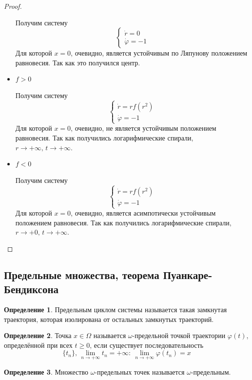 \documentclass[a4paper,12pt]{article}
\renewcommand{\phi}{\ensuremath{\varphi}}
\renewcommand{\geq}{\ensuremath{\geqslant}}
\theoremstyle{plain}
\theoremstyle{definition}
\newtheorem{definition}{Определение}[section]
\theoremstyle{remark}
\begin{document}
\begin{proof}
\begin{itemize}
		      Получим систему
		      \[\begin{cases}
				      \dot{r} = 0 \\
				      \dot{\phi} = -1
			      \end{cases}\]
		      Для которой $x = 0$, очевидно, является устойчивым по Ляпунову положением равновесия. Так как это получился центр.
		\item $f > 0$

		      Получим систему
		      \[\begin{cases}
				      \dot{r} = rf(r^2) \\
				      \dot{\phi} = -1
			      \end{cases}\]
		      Для которой $x = 0$, очевидно, не является устойчивым положением равновесия. Так как получились логарифмические спирали, $r \to +\infty,\, t \to +\infty$.
		\item $f < 0$

		      Получим систему
		      \[\begin{cases}
				      \dot{r} = rf(r^2) \\
				      \dot{\phi} = -1
			      \end{cases}\]
		      Для которой $x = 0$, очевидно, является асимпотически устойчивым положением равновесия. Так как получились логарифмические спирали, $r \to +0,\, t \to +\infty$.
	\end{itemize}
\end{proof}

\subsection{Предельные множества, теорема Пуанкаре-Бендиксона}
\begin{definition}
	Предельным циклом системы называется такая замкнутая траектория, которая изолирована от остальных замкнутых траекторий.
\end{definition}

\begin{definition}
	Точка $x \in \Omega$ называется $\omega$-предельной точкой траектории $\phi(t)$, определённой при всех $t \geq 0$, если существует последовательность
	\[\{t_n\},\, \lim_{n \to +\infty} t_n = +\infty:\: \lim_{n \to +\infty} \phi(t_n) = x\]
\end{definition}

\begin{definition}
	Множество $\omega$-предельных точек называется $\omega$-предельным.
\end{definition}
\end{document}
